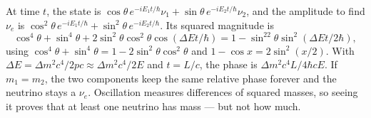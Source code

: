  At time $t$, the state is $\cos\theta\,e^{-iE_1t/\hbar}\nu_1 + \sin\theta\,e^{-iE_2t/\hbar}\nu_2$, and the amplitude to find $\nu_e$ is $\cos^2\theta\,e^{-iE_1t/\hbar} + \sin^2\theta\,e^{-iE_2t/\hbar}$. Its squared magnitude is
\[
  \cos^4\theta + \sin^4\theta + 2\sin^2\theta\cos^2\theta\cos(\Delta Et/\hbar) = 1 - \sin^22\theta\sin^2(\Delta Et/2\hbar),
\]
using $\cos^4\theta+\sin^4\theta = 1-2\sin^2\theta\cos^2\theta$ and $1-\cos x = 2\sin^2(x/2)$. With $\Delta E = \Delta m^2c^4/2pc\approx\Delta m^2c^4/2E$ and $t = L/c$, the phase is $\Delta m^2c^4L/4\hbar cE$. If $m_1 = m_2$, the two components keep the same relative phase forever and the neutrino stays a $\nu_e$. Oscillation measures differences of squared masses, so seeing it proves that at least one neutrino has mass --- but not how much.

